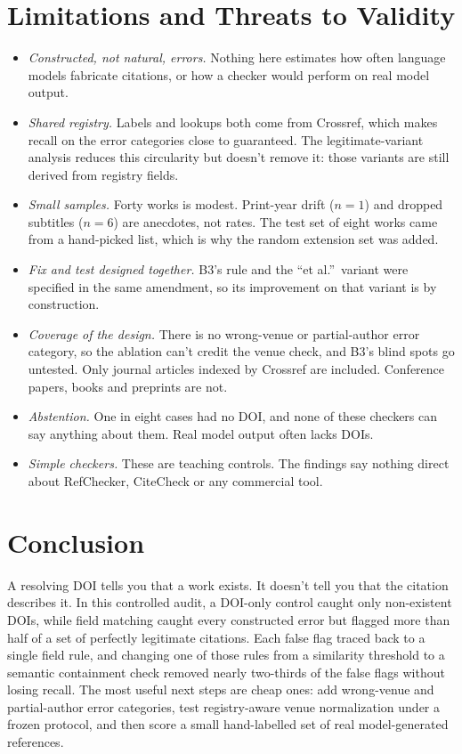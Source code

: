 \documentclass[acmsmall,screen,nonacm]{acmart}
\newcommand{\BThree}{B3}
\begin{document}
\section{Limitations and Threats to Validity}
\begin{itemize}[leftmargin=1.2em,itemsep=1pt]
\item \emph{Constructed, not natural, errors.} Nothing here estimates how often language models fabricate citations, or how a checker would perform on real model output.
\item \emph{Shared registry.} Labels and lookups both come from Crossref, which makes recall on the error categories close to guaranteed. The legitimate-variant analysis reduces this circularity but doesn't remove it: those variants are still derived from registry fields.
\item \emph{Small samples.} Forty works is modest. Print-year drift ($n=1$) and dropped subtitles ($n=6$) are anecdotes, not rates. The test set of eight works came from a hand-picked list, which is why the random extension set was added.
\item \emph{Fix and test designed together.} \BThree{}'s rule and the ``et al.''\ variant were specified in the same amendment, so its improvement on that variant is by construction.\item \emph{Coverage of the design.} There is no wrong-venue or partial-author error category, so the ablation can't credit the venue check, and \BThree{}'s blind spots go untested. Only journal articles indexed by Crossref are included. Conference papers, books and preprints are not.
\item \emph{Abstention.} One in eight cases had no DOI, and none of these checkers can say anything about them. Real model output often lacks DOIs.
\item \emph{Simple checkers.} These are teaching controls. The findings say nothing direct about RefChecker, CiteCheck or any commercial tool.
\end{itemize}

\section{Conclusion}
A resolving DOI tells you that a work exists. It doesn't tell you that the citation describes it. In this controlled audit, a DOI-only control caught only non-existent DOIs, while field matching caught every constructed error but flagged more than half of a set of perfectly legitimate citations. Each false flag traced back to a single field rule, and changing one of those rules from a similarity threshold to a semantic containment check removed nearly two-thirds of the false flags without losing recall. The most useful next steps are cheap ones: add wrong-venue and partial-author error categories, test registry-aware venue normalization under a frozen protocol, and then score a small hand-labelled set of real model-generated references.
\end{document}
